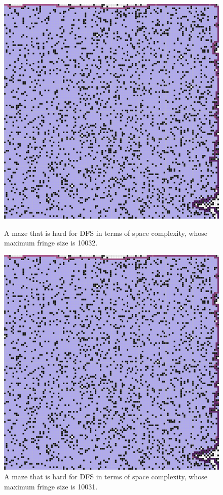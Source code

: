 \documentclass[letter]{article}
\begin{document}
\begin{enumerate}[resume]
\begin{enumerate}
\begin{enumerate}
\begin{figure}
					\includegraphics[width=\textwidth]{../pics/df/10032.png}
					\caption{\label{fig:df2}A maze that is hard for DFS in terms of space complexity, whose maximum fringe size is 10032. }
					\endminipage\hfill
					\includegraphics[width=\textwidth]{../pics/df/10031.png}
					\caption{\label{fig:df3} A maze that is hard for DFS in terms of space complexity, whose maximum fringe size is 10031. }
					\endminipage
					\endminipage 
				\end{figure}
				

\end{enumerate}
\end{enumerate}
\end{enumerate}
\end{document}
